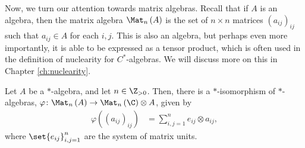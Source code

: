 Now, we turn our attention towards matrix algebras. Recall that if $A$ is an algebra, then the matrix algebra $\Mat_n\left( A \right)$ is the set of $n\times n$ matrices $\left( a_{ij} \right)_{ij}$ such that $a_{ij}\in A$ for each $i,j$. This is also an algebra, but perhaps even more importantly, it is able to be expressed as a tensor product, which is often used in the definition of nuclearity for $C^{\ast}$-algebras. We will discuss more on this in Chapter \ref{ch:nuclearity}.
\begin{theorem}\label{thm:matrix_algebras_tensor_product}
  Let $A$ be a $\ast$-algebra, and let $n\in \N$. Then, there is a $\ast$-isomorphism of $\ast$-algebras, $\varphi\colon \Mat_n\left( A \right)\rightarrow \Mat_n\left( \C \right)\otimes A$, given by
  \begin{align*}
    \varphi\left( \left( a_{ij} \right)_{ij} \right) &= \sum_{i,j=1}^{n}e_{ij}\otimes a_{ij},
  \end{align*}
  where $\set{e_{ij}}_{i,j=1}^{n}$ are the system of matrix units.
\end{theorem}
